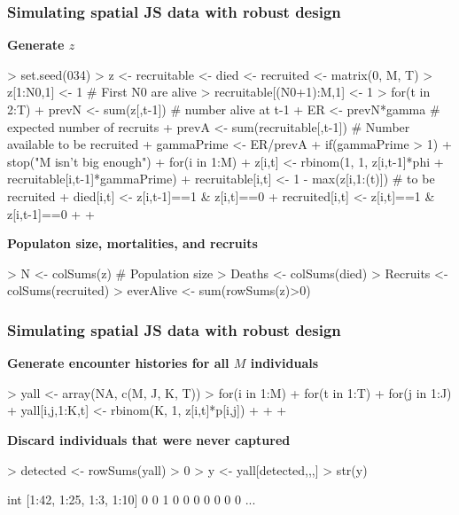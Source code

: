 \documentclass[color=usenames,dvipsnames]{beamer}
\begin{document}
\begin{frame}[fragile]
  \frametitle{Simulating spatial JS data with robust design}
{\bf Generate $z$}
\scriptsize
\begin{Schunk}
\begin{Sinput}
> set.seed(034)
> z <- recruitable <- died <- recruited <- matrix(0, M, T)
> z[1:N0,1] <- 1 # First N0 are alive
> recruitable[(N0+1):M,1] <- 1
> for(t in 2:T) {
+     prevN <- sum(z[,t-1]) # number alive at t-1
+     ER <- prevN*gamma # expected number of recruits
+     prevA <- sum(recruitable[,t-1]) # Number available to be recruited
+     gammaPrime <- ER/prevA
+     if(gammaPrime > 1)
+         stop("M isn't big enough")
+     for(i in 1:M) {
+         z[i,t] <- rbinom(1, 1, z[i,t-1]*phi + recruitable[i,t-1]*gammaPrime)
+         recruitable[i,t] <- 1 - max(z[i,1:(t)]) # to be recruited
+         died[i,t] <- z[i,t-1]==1 & z[i,t]==0
+         recruited[i,t] <- z[i,t]==1 & z[i,t-1]==0
+     }
+ }
\end{Sinput}
\end{Schunk}
\pause
\vfill
{\bf \normalsize Populaton size, mortalities, and recruits}
\begin{Schunk}
\begin{Sinput}
> N <- colSums(z) # Population size
> Deaths <- colSums(died)
> Recruits <- colSums(recruited)
> everAlive <- sum(rowSums(z)>0)
\end{Sinput}
\end{Schunk}
\end{frame}









\begin{frame}[fragile]
  \frametitle{Simulating spatial JS data with robust design}
{\bf Generate encounter histories for all $M$ individuals}
\footnotesize
\begin{Schunk}
\begin{Sinput}
> yall <- array(NA, c(M, J, K, T))
> for(i in 1:M) {
+     for(t in 1:T) {
+         for(j in 1:J) {
+             yall[i,j,1:K,t] <- rbinom(K, 1, z[i,t]*p[i,j])
+         }
+     }
+ }
\end{Sinput}
\end{Schunk}
\pause
\vfill
{\bf \normalsize Discard individuals that were never captured}
\begin{Schunk}
\begin{Sinput}
> detected <- rowSums(yall) > 0
> y <- yall[detected,,,]
> str(y)
\end{Sinput}
\begin{Soutput}
 int [1:42, 1:25, 1:3, 1:10] 0 0 1 0 0 0 0 0 0 0 ...
\end{Soutput}
\end{Schunk}
\end{frame}
\end{document}
